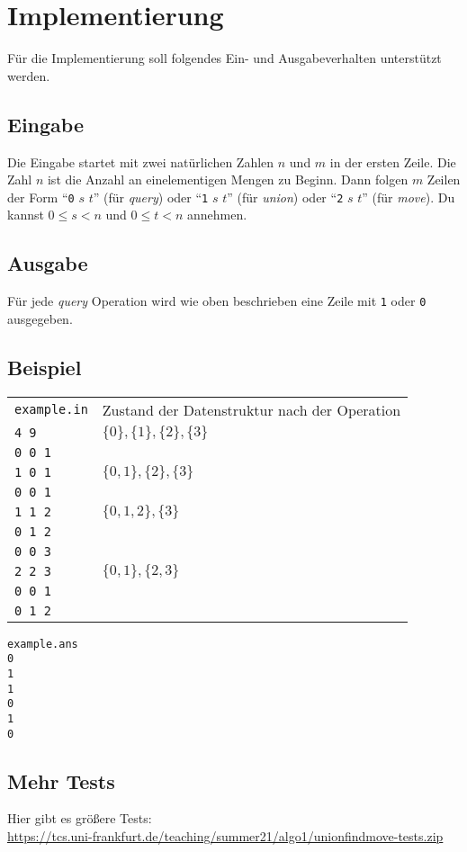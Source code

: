 \documentclass{uebung_cs}
\begin{document}
  \appendix
  \section{Implementierung}\label{implementierung}
  Für die Implementierung soll folgendes Ein- und Ausgabeverhalten unterstützt werden.
  \subsection*{Eingabe}
  
  Die Eingabe startet mit zwei natürlichen Zahlen $n$ und $m$ in der ersten Zeile.
  Die Zahl $n$ ist die Anzahl an einelementigen Mengen zu Beginn.
  Dann folgen $m$ Zeilen der Form
  \enquote{\texttt{0} $s$ $t$} (für \emph{query}) oder \enquote{\texttt{1} $s$ $t$} (für \emph{union}) oder \enquote{\texttt{2} $s$ $t$} (für \emph{move}).
  Du kannst $0\leq s< n$ und $0\leq t< n$ annehmen.

  \subsection*{Ausgabe}
  
  Für jede \emph{query} Operation wird wie oben beschrieben eine Zeile mit \texttt{1} oder \texttt{0} ausgegeben.
  
  \subsection*{Beispiel}
  \begin{tabular}{ll}
  \texttt{example.in}& Zustand der Datenstruktur nach der Operation\\
    \texttt{4 9}   & $\{0\}, \{1\}, \{2\},\{3\}$\\
    \texttt{0 0 1} \\
    \texttt{1 0 1} & $\{0, 1\}, \{2\},\{3\}$ \\
    \texttt{0 0 1} &\\
    \texttt{1 1 2} & $\{0, 1, 2\},\{3\}$ \\
    \texttt{0 1 2} &\\
    \texttt{0 0 3} &\\
    \texttt{2 2 3}   & $\{0, 1\}, \{2,3\}$ \\
    \texttt{0 0 1} &\\
    \texttt{0 1 2} &
  \end{tabular}

  \noindent
  \begin{verbatim}
example.ans
0
1
1
0
1
0
  \end{verbatim}

  \subsection*{Mehr Tests}
  Hier gibt es größere Tests:\\
  \small\url{https://tcs.uni-frankfurt.de/teaching/summer21/algo1/unionfindmove-tests.zip}
\end{document}
